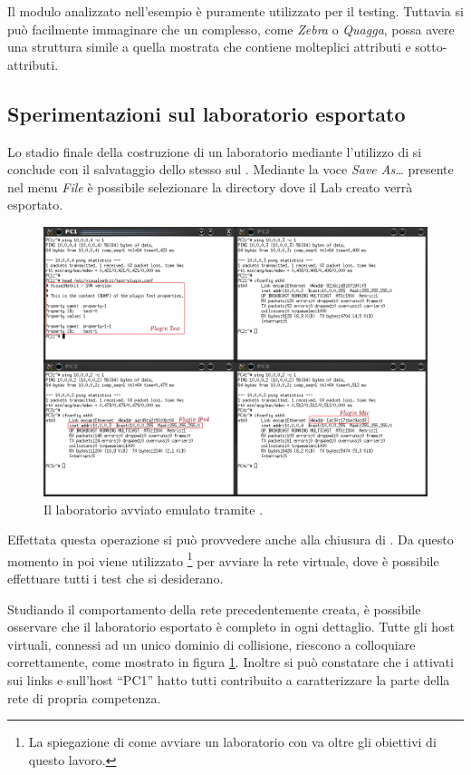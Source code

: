 Il modulo analizzato nell'esempio è puramente utilizzato per il testing. Tuttavia si può facilmente immaginare che un \plugin{} complesso, come \emph{Zebra} o \emph{Quagga}, possa avere una struttura simile a quella mostrata che contiene molteplici attributi e sotto-attributi.

\subsection{Sperimentazioni sul laboratorio esportato}
Lo stadio finale della costruzione di un laboratorio mediante l'utilizzo di \visualnetkit{} si conclude con il salvataggio dello stesso sul \fs{}. Mediante la voce \emph{Save As\ldots} presente nel menu \emph{File} è possibile selezionare la directory dove il Lab creato verrà esportato.

\begin{figure}[!htb]
	\centering
	\includegraphics[width=13cm]{images/netkit_lab_example.png}
	\caption{Il laboratorio avviato emulato tramite \netkit{}.}
	\label{figura:ex_netkit}
\end{figure}

Effettata questa operazione si può provvedere anche alla chiusura di \visualnetkit{}. Da questo momento in poi viene utilizzato \netkit{}\footnote{La spiegazione di come avviare un laboratorio con \netkit{} va oltre gli obiettivi di questo lavoro.} per avviare la rete virtuale, dove è possibile effettuare tutti i test che si desiderano.

Studiando il comportamento della rete precedentemente creata, è possibile osservare che il laboratorio esportato è completo in ogni dettaglio. Tutte gli host virtuali, connessi ad un unico dominio di collisione, riescono a colloquiare correttamente, come mostrato in figura \ref{figura:ex_netkit}. Inoltre si può constatare che i \plugin{} attivati sui links e sull'host ``PC1'' hatto tutti contribuito a caratterizzare la parte della rete di propria competenza.

